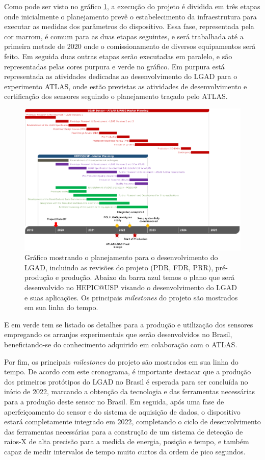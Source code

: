Como pode ser visto no gráfico \ref{cronograma}, a execução do projeto é dividida em três etapas onde inicialmente o planejamento prevê o estabelecimento da infraestrutura para executar as medidas dos parâmetros do dispositivo. Essa fase, representada pela cor marrom, é comum para as duas etapas seguintes, e será trabalhada até a primeira metade de 2020 onde o comissionamento de diversos equipamentos será feito. Em seguida duas outras etapas serão executadas em paralelo, e são representadas pelas cores purpura e verde no gráfico. Em purpura está representada as atividades dedicadas ao desenvolvimento do LGAD para o experimento ATLAS, onde estão previstas as atividades de desenvolvimento e certificação dos sensores seguindo o planejamento traçado pelo ATLAS.
\begin{figure}
    \centering
    \includegraphics[width=18.0cm]{assets/cronograma.png}
    \caption{Gráfico mostrando o planejamento para o desenvolvimento do LGAD, incluindo as revisões do projeto (PDR, FDR, PRR), pré-produção e produção. Abaixo da barra azul temos o plano que será desenvolvido no HEPIC@USP visando o desenvolvimento do LGAD e suas aplicações. Os principais {\it milestones} do projeto são mostrados em sua linha do tempo.}
    \label{cronograma}
\end{figure}
E em verde tem se listado os detalhes para a produção e utilização dos sensores empregando os arranjos experimentais que serão desenvolvidos no Brasil, beneficiando-se do conhecimento adquirido em colaboração com o ATLAS.

Por fim, os principais {\it milestones} do projeto são mostrados em sua linha do tempo. De acordo com este cronograma, é importante destacar que a produção dos primeiros protótipos do LGAD no Brasil é esperada para ser concluída no início de 2022, marcando a obtenção da tecnologia e das ferramentas necessárias para a produção deste sensor no Brasil. Em seguida, após uma fase de aperfeiçoamento do sensor e do sistema de aquisição de dados, o dispositivo estará completamente integrado em 2022, completando o ciclo de desenvolvimento das ferramentas necessárias para a construção de um sistema de detecção de raios-X de alta precisão para a medida de energia, posição e tempo, e também capaz de medir intervalos de tempo muito curtos da ordem de pico segundos.